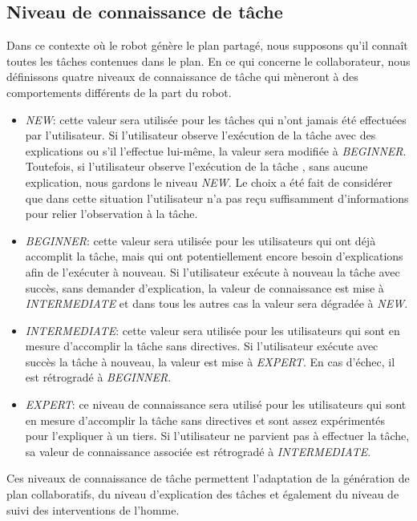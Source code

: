 \documentclass[a4paper,11pt,twoside]{StyleThese}
\begin{document}
\subsection{Niveau de connaissance de tâche}

Dans ce contexte où le robot génère le plan partagé, nous supposons qu'il connaît toutes les tâches contenues dans le plan.
En ce qui concerne le collaborateur, nous définissons quatre niveaux de connaissance de tâche qui mèneront à des comportements différents de la part du robot.

\begin{itemize}
\item \textit{NEW}: cette valeur sera utilisée pour les tâches qui n'ont jamais été effectuées par l'utilisateur. Si l'utilisateur observe l'exécution de la tâche avec des explications ou s'il l'effectue lui-même, la valeur sera modifiée à \textit{BEGINNER}.
Toutefois, si l'utilisateur observe l'exécution de la tâche , sans aucune explication, nous gardons le niveau \textit{NEW}. Le choix a été fait de considérer que dans cette situation l'utilisateur n'a pas reçu suffisamment d'informations pour relier l'observation à la tâche.
\item \textit{BEGINNER}: cette valeur sera utilisée pour les utilisateurs qui ont déjà accomplit la tâche, mais qui ont potentiellement encore besoin d'explications afin de l'exécuter à nouveau. Si l'utilisateur exécute à nouveau la tâche avec succès, sans demander d'explication, la valeur de connaissance est mise à \textit{INTERMEDIATE} et dans tous les autres cas la valeur sera dégradée à \textit{NEW}.
\item \textit{INTERMEDIATE}: cette valeur sera utilisée pour les utilisateurs qui sont en mesure d'accomplir la tâche sans directives. Si l'utilisateur exécute avec succès la tâche à nouveau, la valeur est mise à \textit{EXPERT}. En cas d'échec, il est rétrogradé à \textit{BEGINNER}.
\item \textit{EXPERT}: ce niveau de connaissance sera utilisé pour les utilisateurs qui sont en mesure d'accomplir la tâche sans directives et sont assez expérimentés pour l'expliquer à un tiers. Si l'utilisateur ne parvient pas à effectuer la tâche, sa valeur de connaissance associée est rétrogradé à \textit{INTERMEDIATE}.
\end{itemize}

Ces niveaux de connaissance de tâche permettent l'adaptation de la génération de plan collaboratifs, du niveau d'explication des tâches et également du niveau de suivi des interventions de l'homme.
\end{document}
